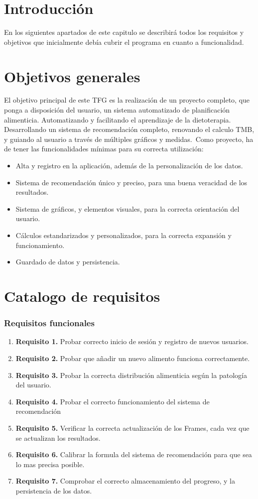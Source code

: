 
\section{Introducción}
En los siguientes apartados de este capitulo se describirá todos los requisitos y objetivos que inicialmente debía cubrir el programa en cuanto a funcionalidad.
\section{Objetivos generales}
El objetivo principal de este TFG es la realización de un proyecto completo, que ponga a disposición del usuario, un sistema automatizado de planificación alimenticia. Automatizando y facilitando el aprendizaje de la dietoterapia. Desarrollando un sistema de recomendación completo, renovando el calculo TMB, y guiando al usuario a través de múltiples gráficos y medidas.\
Como proyecto, ha de tener las funcionalidades mínimas para su correcta utilización:
\begin{itemize}
\item Alta y registro en la aplicación, además de la personalización de los datos.
\item Sistema de recomendación único y preciso, para una buena veracidad de los resultados.
\item Sistema de gráficos, y elementos visuales, para la correcta orientación del usuario.
\item Cálculos estandarizados y personalizados, para la correcta expansión y funcionamiento.
\item Guardado de datos y persistencia.
\end{itemize}
\section{Catalogo de requisitos}
\subsubsection{Requisitos funcionales}
\begin{enumerate}
\item \textbf{Requisito 1.} Probar correcto inicio de sesión y registro de nuevos usuarios.
\item \textbf{Requisito 2.} Probar que añadir un nuevo alimento funciona correctamente.
\item \textbf{Requisito 3.} Probar la correcta distribución alimenticia según la patología del usuario.
\item \textbf{Requisito 4.} Probar el correcto funcionamiento del sistema de recomendación
\item \textbf{Requisito 5.} Verificar la correcta actualización de los Frames, cada vez que se actualizan los resultados.
\item \textbf{Requisito 6.} Calibrar la formula del sistema de recomendación para que sea lo mas precisa posible.
\item \textbf{Requisito 7.} Comprobar el correcto almacenamiento del progreso, y la persistencia de los datos.
\end{enumerate}
